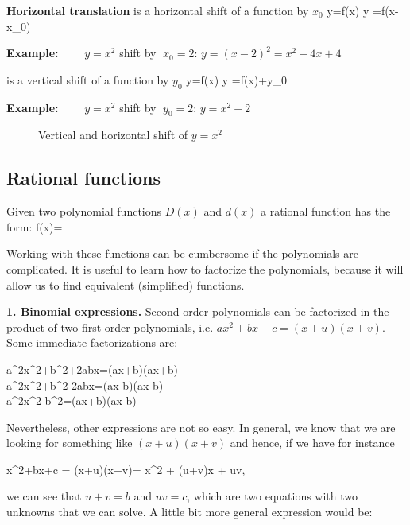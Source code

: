 \newpage

{\bf Horizontal translation} is a horizontal shift of a function by $x_0$
\bnn y=f(x) \; \rightarrow \; y =f(x-x_0) \enn

{\bf Example:} $\qquad y = x^2$  \; shift by $\; x_0=2$: \; $ y = (x-2)^2 = x^2 - 4x +4$  \vs

 is a vertical shift of a function by $y_0$
\bnn y=f(x) \; \rightarrow \; y =f(x)+y_0 \enn

{\bf Example:} $\qquad y=x^2$ \; shift by $\; y_0=2$: \;  $ y=x^2+2 $ \vs

\vs\begin{figure}[!h]
\centering {} 
\hspace*{0.5cm}
 \svs 
\caption{Vertical and horizontal shift of $y=x^2$} \label{fig11}
\end{figure}

\subsection{Rational functions}

Given two polynomial functions $D(x)$ and $d(x)$ a rational function has the form:
\bnn f(x)= \enn

Working with these functions can be cumbersome if the polynomials are complicated. It is
useful to learn how to factorize the polynomials, because it will allow us to find equivalent
(simplified) functions. 

{\bf 1. Binomial expressions.} Second order polynomials can be factorized in the product of two first order polynomials, i.e. $ax^2+bx+c = (x+u)(x+v)$. Some immediate factorizations are:

\bnn
 	a^2x^2+b^2+2abx=(ax+b)(ax+b)\\
 	a^2x^2+b^2-2abx=(ax-b)(ax-b)\\
    a^2x^2-b^2=(ax+b)(ax-b)
\enn 

Nevertheless, other expressions are not so easy. In general, we know that we are looking
for something like $(x+u)(x+v)$ and hence, if we have for instance

\bnn x^2+bx+c = (x+u)(x+v)= x^2 + (u+v)x + uv, \enn

we can see that $u+v=b$ and $uv=c$, which are two equations with two unknowns that we can solve. A little
bit more general expression would be:

